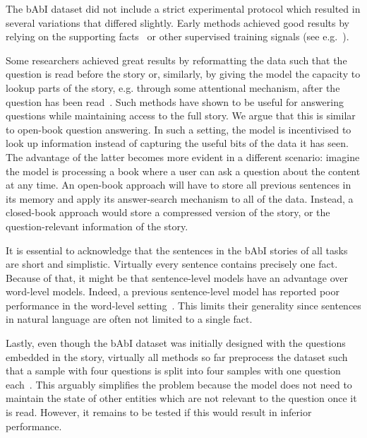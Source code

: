 \documentclass{article} \usepackage{iclr2021_conference,times}
\begin{document}
The bAbI dataset did not include a strict experimental protocol which resulted in several variations that differed slightly.
Early methods achieved good results by relying on the supporting facts~\citep{weston2015memorynets, kumar2016dmn} or other supervised training signals (see e.g.~\citet{johnson2017transitions, Li2016gatedgraphs}).

Some researchers achieved great results by reformatting the data such that the question is read before the story or, similarly, by giving the model the capacity to lookup parts of the story, e.g. through some attentional mechanism, after the question has been read~\citep{sukhbaatar2015end,xiong2016dynamic,dehghani2018universal}.
Such methods have shown to be useful for answering questions while maintaining access to the full story.
We argue that this is similar to open-book question answering.
In such a setting, the model is incentivised to look up information instead of capturing the useful bits of the data it has seen. 
The advantage of the latter becomes more evident in a different scenario: imagine the model is processing a book where a user can ask a question about the content at any time.
An open-book approach will have to store all previous sentences in its memory and apply its answer-search mechanism to all of the data. 
Instead, a closed-book approach would store a compressed version of the story, or the question-relevant information of the story.

It is essential to acknowledge that the sentences in the bAbI stories of all tasks are short and simplistic.
Virtually every sentence contains precisely one fact. 
Because of that, it might be that sentence-level models have an advantage over word-level models.
Indeed, a previous sentence-level model has reported poor performance in the word-level setting~\citep{schlag2018nips}.
This limits their generality since sentences in natural language are often not limited to a single fact.

Lastly, even though the bAbI dataset was initially designed with the questions embedded in the story, virtually all methods so far preprocess the dataset such that a sample with four questions is split into four samples with one question each~\citep{weston2015memorynets}.
This arguably simplifies the problem because the model does not need to maintain the state of other entities which are not relevant to the question once it is read. However, it remains to be tested if this would result in inferior performance.
\end{document}

